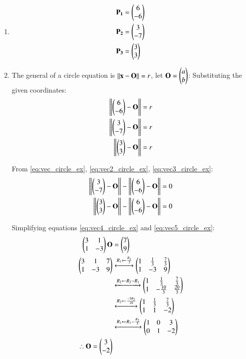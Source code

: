 \renewcommand{\theequation}{\theenumi}
\begin{enumerate}[label=\thesubsection.\arabic*.,ref=\thesubsection.\theenumi]
\item \begin{align}
\mathbf{P_1} &= \begin{pmatrix}6\\-6\end{pmatrix}\\
\mathbf{P_2} &= \begin{pmatrix}3\\-7\end{pmatrix}\\
\mathbf{P_3} &= \begin{pmatrix}3\\3\end{pmatrix}
\end{align}

\item The general of a circle equation is $\left\lVert\mathbf{x}-\mathbf{O}\right\rVert = r$, let $\mathbf{O} =  \begin{pmatrix}a\\b\end{pmatrix}$:
Substituting the given coordinates:
\begin{align}
\left\lVert\begin{pmatrix}6\\-6\end{pmatrix}-\mathbf{O}\right\rVert &= r \label{eq:vec_circle_ex} \\
\left\lVert\begin{pmatrix}3\\-7\end{pmatrix}-\mathbf{O}\right\rVert &= r \label{eq:vec2_circle_ex}\\
\left\lVert\begin{pmatrix}3\\3\end{pmatrix}-\mathbf{O}\right\rVert &= r \label{eq:vec3_circle_ex}
\end{align}

From \eqref{eq:vec_circle_ex}, \eqref{eq:vec2_circle_ex}, \eqref{eq:vec3_circle_ex}:
\begin{align}
\left\lVert\begin{pmatrix}3\\-7\end{pmatrix}-\mathbf{O}\right\rVert - \left\lVert\begin{pmatrix}6\\-6\end{pmatrix}-\mathbf{O}\right\rVert &= 0 \label{eq:vec4_circle_ex} \\
\left\lVert\begin{pmatrix}3\\3\end{pmatrix}-\mathbf{O}\right\rVert - \left\lVert\begin{pmatrix}6\\-6\end{pmatrix}-\mathbf{O}\right\rVert &= 0 \label{eq:vec5_circle_ex}
\end{align} 

Simplifying equations \eqref{eq:vec4_circle_ex} and \eqref{eq:vec5_circle_ex}:
\begin{align}
\begin{pmatrix}3 & 1 \\ 1 & -3 \end{pmatrix}\mathbf{O} &= \begin{pmatrix}7\\9\end{pmatrix}\\
\begin{pmatrix}3 & 1 & 7  \\
1 & -3 & 9 
\end{pmatrix}
&\xleftrightarrow[]{R_1 \leftarrow \frac{R_1}{3}}
\begin{pmatrix}1 & \frac{1}{3} & \frac{7}{3} \\
1 & -3 & 9 
\end{pmatrix}\\
&\xleftrightarrow[]{R_2 \leftarrow R_2 - R_1}
\begin{pmatrix}1 & \frac{1}{3} & \frac{7}{3} \\
1 & -\frac{10}{3} & \frac{20}{3} 
\end{pmatrix}\\
&\xleftrightarrow[]{R_2 \leftarrow \frac{-3R_2}{10}}
\begin{pmatrix}1 & \frac{1}{3} & \frac{7}{3} \\
1 & 1 & -2 
\end{pmatrix}\\
&\xleftrightarrow[]{R_1 \leftarrow R_1-\frac{R_2}{3}}
\begin{pmatrix}1 & 0 & 3 \\
0 & 1 & -2 
\end{pmatrix}\\
\therefore \mathbf{O} = \begin{pmatrix}3\\-2\end{pmatrix}
\end{align}


\end{enumerate}
